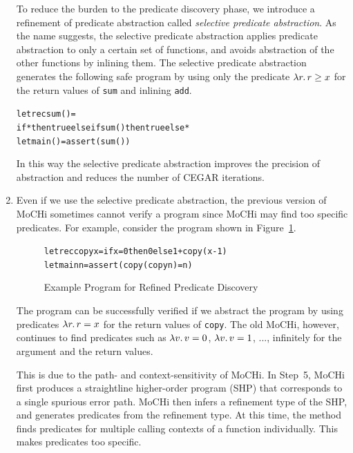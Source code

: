 \begin{enumerate}
      To reduce the burden to the predicate discovery phase, we introduce
      a refinement of predicate abstraction called \emph{selective
      predicate abstraction}.  As the name suggests, the selective
      predicate abstraction applies predicate abstraction to only a
      certain set of functions, and avoids abstraction of the other
      functions by inlining them.  The selective predicate abstraction
      generates the following safe program by using only the
      predicate $\lambda{r}.\,{r \geq x}$ for the return values of \texttt{sum}
      and inlining \texttt{add}.
\vspace{-5pt}
\begin{alltt}
 letrec sum () =
   if * then true else if sum() then true else *
 let main () = assert (sum ())
\end{alltt}
\vspace{-5pt}
      In this way the selective predicate abstraction improves the
      precision of abstraction and reduces the number of CEGAR iterations.

\item Even if we use the selective predicate abstraction, the previous
      version of MoCHi sometimes cannot verify a program since MoCHi may
      find too specific predicates.  For example, consider the program
      shown in Figure~\ref{fig:copy}.
\begin{figure}[t]
\vspace{-5pt}
\begin{alltt}
 letrec copy x = if x=0 then 0 else 1 + copy (x-1)
 let main n = assert (copy (copy n) = n)
\end{alltt}
\vspace{-5pt}
\caption{Example Program for Refined Predicate Discovery}
\label{fig:copy}
\end{figure}
      The program can be successfully verified if we abstract the
      program by using predicates $\lambda{r}.\,{r = x}$ for the return values
      of \texttt{copy}.  The old MoCHi, however, continues to find
      predicates such as $\lambda{v}.\,{v = 0}$, $\lambda{v}.\,{v = 1}$, ...,
      infinitely for the argument and the return values.

      This is due to the path- and context-sensitivity of MoCHi.
      In Step~5, MoCHi first produces a
      straightline higher-order program (SHP) that corresponds to a
      single spurious error path.  MoCHi then infers a refinement type
      of the SHP, and generates predicates from the refinement type.
      At this time, the method finds predicates for multiple
      calling contexts of a function individually.  This makes predicates too
      specific.


\end{enumerate}
